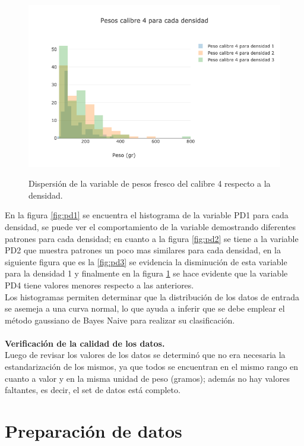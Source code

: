 \begin{figure}[h!]
	\caption{Dispersión de la variable de pesos fresco del calibre 4 respecto a la densidad.}
	\centering
	\includegraphics[scale=0.6]{PD4.png}
	\label{fig:pd4}
\end{figure}

En la figura \ref{fig:pd1} se encuentra el histograma de la variable PD1 para cada densidad, se puede ver el comportamiento de la variable demostrando diferentes patrones para cada densidad; en cuanto a la figura \ref{fig:pd2} se tiene a la variable PD2 que muestra patrones un poco mas similares para cada densidad, en la siguiente figura que es la \ref{fig:pd3} se evidencia la disminución de esta variable para la densidad 1 y finalmente en la figura \ref{fig:pd4} se hace evidente que la variable PD4 tiene valores menores respecto a las anteriores.\\

Los histogramas permiten determinar que la distribución de los datos de entrada se asemeja a una curva normal, lo que ayuda a inferir que se debe emplear el método gaussiano de Bayes Naive para realizar su clasificación.\\\\

\noindent
\textbf{Verificación de la calidad de los datos.}\\

Luego de revisar los valores de los datos se determinó que no era necesaria la estandarización de los mismos, ya que todos se encuentran en el mismo rango en cuanto a valor y en la misma unidad de peso (gramos); además no hay valores faltantes, es decir, el set de datos está completo.

\section{Preparación de datos}


